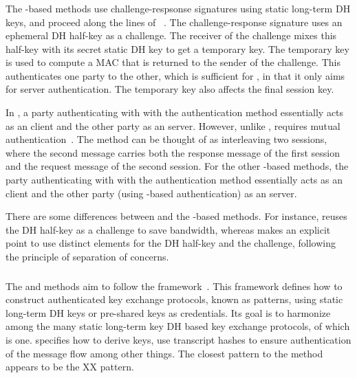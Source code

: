 \spacehack
\subsubsection{\mOptls{}}
\label{sec:optls}
The \mStat-based methods use challenge-respsonse signatures using static
long-term DH keys, and proceed along the lines of
\mOptls~\cite{DBLP:conf/eurosp/KrawczykW16}.
%
The challenge-response signature uses an ephemeral DH half-key as a challenge.
%
The receiver of the challenge mixes this half-key with its secret static DH
key to get a temporary key.
%
The temporary key is used to compute a MAC that is returned to the sender of the
challenge.
%
This authenticates one party to the other, which is sufficient for \mOptls,
in that it only aims for server authentication.
%
The temporary key also affects the final session key.
%

In \mEdhoc, a party authenticating with with the \mStat{} authentication method
essentially acts as an \mOptls{} client and the other party as an \mOptls{}
server.
%
However, unlike \mOptls{}, \mEdhoc{} requires mutual
authentication~\cite{ietf-lake-reqs-04}.
%
The \mStatStat{} method can be thought of as interleaving two \mOptls{}
sessions, where the second \mEdhoc{} message carries both the response
message of the first \mOptls{} session and the request message of the
second \mOptls{} session.
%
For the other \mStat{}-based methods, the party authenticating with with the
\mStat{} authentication method essentially acts as an \mOptls{} client and the
other party (using \mSig{}-based authentication) as an \mOptls{} server.
%

There are some differences between \mOptls{} and the \mStat{}-based methods.
%
For instance, \mEdhoc{} reuses the DH half-key as a challenge to save
bandwidth, whereas \mOptls{} makes an explicit point to use distinct elements
for the DH half-key and the challenge, following the principle of separation
of concerns.
%

\spacehack
\subsubsection{\mNoise{}}
The \mStatStat{} and \mPskPsk{} methods aim to follow the \mNoise{}
framework~\cite{perrin2016noise}.
%
This framework defines how to construct authenticated key exchange protocols,
known as patterns, using static long-term DH keys or pre-shared
keys as credentials.
%
Its goal is to harmonize among the many static long-term key DH
based key exchange protocols, of which \mOptls{} is one.
%
\mNoise{} specifies how to derive keys, use transcript hashes to ensure
authentication of the message flow among other things.
%
The closest \mNoise{} pattern to the \mStatStat{} method appears to be the
XX pattern.
%

